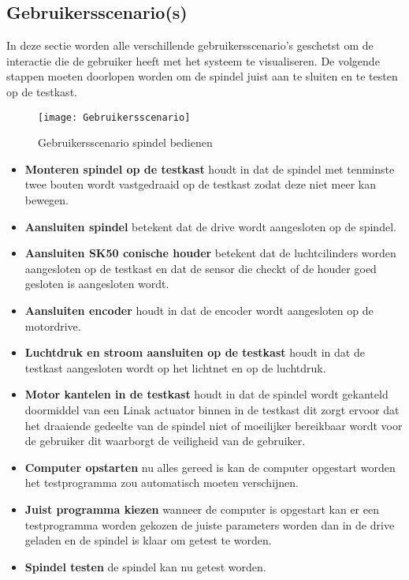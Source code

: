 \newpage

\subsection{Gebruikersscenario(s)}

In deze sectie worden alle verschillende gebruikersscenario’s geschetst om de interactie die de gebruiker heeft met het systeem te visualiseren. De volgende stappen moeten doorlopen worden om de spindel juist aan te sluiten en te testen op de testkast.

\begin{figure}[H]
	\centering
	\texttt{[image: Gebruikersscenario]}
	\label{fig:Gebruikersscenario}
	\caption{Gebruikersscenario spindel bedienen}
\end{figure}

\newpage

\begin{itemize}
	\item \textbf{Monteren spindel op de testkast} houdt in dat de spindel met tenminste twee bouten wordt vastgedraaid op de testkast zodat deze niet meer kan bewegen.
	
	\item \textbf{Aansluiten spindel} betekent dat de drive wordt aangesloten op de spindel.
	
	\item \textbf{Aansluiten SK50 conische houder} betekent dat de luchtcilinders worden aangesloten op de testkast en dat de sensor die checkt of de houder goed gesloten is aangesloten wordt.
	
	\item \textbf{Aansluiten encoder} houdt in dat de encoder wordt aangesloten op de motordrive.
	
	\item \textbf{Luchtdruk en stroom aansluiten op de testkast} houdt in dat de testkast aangesloten wordt op het lichtnet en op de luchtdruk.
	
	\item \textbf{Motor kantelen in de testkast} houdt in dat de spindel wordt gekanteld doormiddel van een Linak actuator binnen in de testkast dit zorgt ervoor dat het draaiende gedeelte van de spindel niet of moeilijker bereikbaar wordt voor de gebruiker dit waarborgt de veiligheid van de gebruiker.
	
	\item \textbf{Computer opstarten} nu alles gereed is kan de computer opgestart worden het testprogramma zou automatisch moeten verschijnen.
	
	\item \textbf{Juist programma kiezen} wanneer de computer is opgestart kan er een testprogramma worden gekozen de juiste parameters worden dan in de drive geladen en de spindel is klaar om getest te worden.
	
	\item \textbf{Spindel testen} de spindel kan nu getest worden.
\end{itemize}

